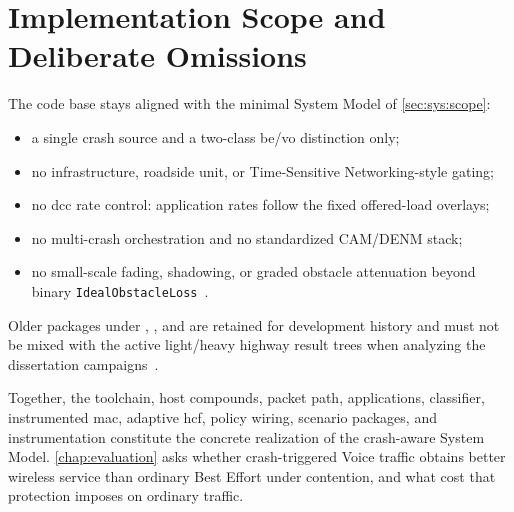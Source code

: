 \section{Implementation Scope and Deliberate Omissions}
\label{sec:impl:scope}

The code base stays aligned with the minimal System Model of \autoref{sec:sys:scope}:

\begin{itemize}
  \item a single crash source and a two-class \gls{be}/\gls{vo} distinction only;
  \item no infrastructure, roadside unit, or Time-Sensitive Networking-style gating;
  \item no \gls{dcc} rate control: application rates follow the fixed offered-load overlays;
  \item no multi-crash orchestration and no standardized CAM/DENM stack;
  \item no small-scale fading, shadowing, or graded obstacle attenuation beyond binary \texttt{IdealObstacleLoss}~\cite{inet_ideal_obstacle_loss}.
\end{itemize}

Older packages under ,
, and 
are retained for development history and must not be mixed with the active light/heavy highway result trees when analyzing the dissertation campaigns~\cite{aguiar2026_veins_qos}.

Together, the toolchain, host compounds, packet path, applications, classifier, instrumented \gls{mac}, adaptive \gls{hcf}, policy wiring, scenario packages, and instrumentation constitute the concrete realization of the crash-aware System Model.
\autoref{chap:evaluation} asks whether crash-triggered Voice traffic obtains better wireless service than ordinary Best Effort under contention, and what cost that protection imposes on ordinary traffic.

